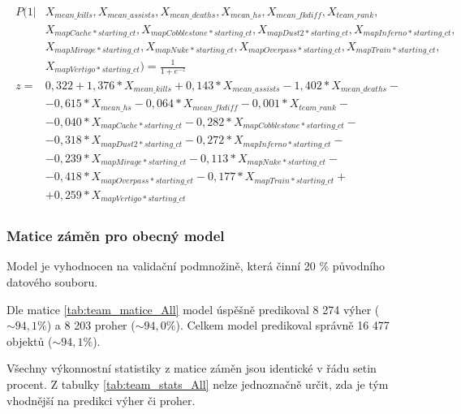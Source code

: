 \begin{align*}
    \begin{split}
        P(1 | &X_{mean\_kills}, X_{mean\_assists}, X_{mean\_deaths}, X_{mean\_hs}, X_{mean\_fkdiff}, X_{team\_rank}, \\
              &X_{mapCache*starting\_ct}, X_{mapCobblestone*starting\_ct}, X_{mapDust2*starting\_ct}, X_{mapInferno*starting\_ct}, \\
              &X_{mapMirage*starting\_ct}, X_{mapNuke*starting\_ct}, X_{mapOverpass*starting\_ct}, X_{mapTrain*starting\_ct}, \\
              &X_{mapVertigo*starting\_ct}) = \frac{1}{1 + e^{-z}} \\
        z = &0,322 + 1,376*X_{mean\_kills} + 0,143*X_{mean\_assists} - 1,402*X_{mean\_deaths} - \\
            &- 0,615*X_{mean\_hs} - 0,064*X_{mean\_fkdiff} - 0,001*X_{team\_rank} - \\
            &- 0,040*X_{mapCache*starting\_ct} - 0,282*X_{mapCobblestone*starting\_ct} - \\
            &- 0,318*X_{mapDust2*starting\_ct} - 0,272*X_{mapInferno*starting\_ct} - \\
            &- 0,239*X_{mapMirage*starting\_ct} - 0,113*X_{mapNuke*starting\_ct} - \\
            &- 0,418*X_{mapOverpass*starting\_ct} - 0,177*X_{mapTrain*starting\_ct} + \\
            &+ 0,259*X_{mapVertigo*starting\_ct}
    \end{split}
\end{align*}

\subsubsection{Matice záměn pro obecný model}
Model je vyhodnocen na validační podmnožině, která činní 20 \% původního datového souboru.



Dle matice \ref{tab:team_matice_All} model úspěšně predikoval 8 274 výher ($\sim 94,1 \%$) a 8 203 proher ($\sim 94,0 \%$). Celkem
model predikoval správně 16 477 objektů ($\sim 94,1 \%$).



Všechny výkonnostní statistiky z matice záměn jsou identické v řádu setin procent. Z tabulky \ref{tab:team_stats_All} nelze jednoznačně určit, zda je tým
vhodnější na predikci výher či proher.

